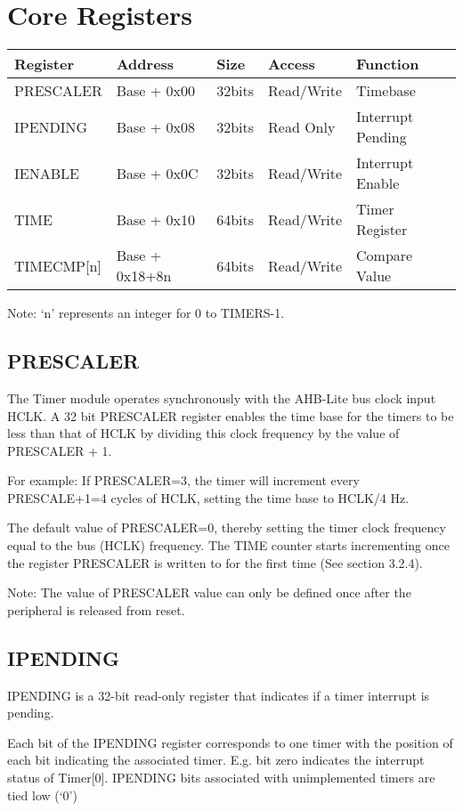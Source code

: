 \section{Core Registers}\label{core-registers}

\begin{longtable}[]{@{}lllll@{}}
\toprule
Register & Address & Size & Access & Function\tabularnewline
\midrule
\endhead
PRESCALER & Base + 0x00 & 32bits & Read/Write & Timebase\tabularnewline
IPENDING & Base + 0x08 & 32bits & Read Only & Interrupt
Pending\tabularnewline
IENABLE & Base + 0x0C & 32bits & Read/Write & Interrupt
Enable\tabularnewline
TIME & Base + 0x10 & 64bits & Read/Write & Timer Register\tabularnewline
TIMECMP[n] & Base + 0x18+8n & 64bits & Read/Write & Compare
Value\tabularnewline
\bottomrule
\end{longtable}

Note: `n' represents an integer for 0 to TIMERS-1.

\subsection{PRESCALER}\label{prescaler}

The Timer module operates synchronously with the AHB-Lite bus clock
input HCLK. A 32 bit PRESCALER register enables the time base for the
timers to be less than that of HCLK by dividing this clock frequency by
the value of PRESCALER + 1.

For example: If PRESCALER=3, the timer will increment every PRESCALE+1=4
cycles of HCLK, setting the time base to HCLK/4 Hz.

The default value of PRESCALER=0, thereby setting the timer clock
frequency equal to the bus (HCLK) frequency. The TIME counter starts
incrementing once the register PRESCALER is written to for the first
time (See section 3.2.4).

Note: The value of PRESCALER value can only be defined once after the
peripheral is released from reset.

\subsection{IPENDING}\label{ipending}

IPENDING is a 32-bit read-only register that indicates if a timer
interrupt is pending.

Each bit of the IPENDING register corresponds to one timer with the
position of each bit indicating the associated timer. E.g. bit zero
indicates the interrupt status of Timer[0]. IPENDING bits associated
with unimplemented timers are tied low (`0')

